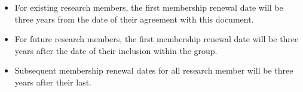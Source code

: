 \documentclass[a4paper, 11pt]{scrartcl}
\begin{document}
\begin{itemize}

\item For existing research members, the first membership renewal date will be three years from the date of their agreement with this document. 
\item For future research members, the first membership renewal date will be three years after the date of their inclusion within the group. 
\item Subsequent membership renewal dates for all research member will be three years after their last.

\end{itemize}
\end{document}
